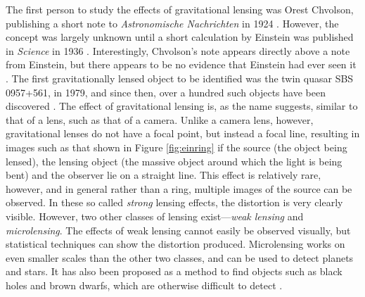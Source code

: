 \documentclass[a4paper,11pt]{article}
\begin{document}
   The first person to study the effects of gravitational lensing was Orest
   Chvolson, publishing a short note to \emph{Astronomische Nachrichten} in 1924
   \cite{chwolsonlensing}. However, the concept was largely unknown until a short
   calculation by Einstein was published in \emph{Science} in 1936
   \cite{einsteinlensing}. Interestingly, Chvolson's note appears directly above a
   note from Einstein\cite{einsteinchwolson}, but there appears to be no evidence that Einstein had ever
   seen it \cite{renn2000eclipses}. The first gravitationally
   lensed object to be identified was the twin quasar SBS 0957+561, in 1979, and
   since then, over a hundred such objects have been discovered
   \cite{firstlens,gravlenscount}. The effect of gravitational lensing is, as the
   name suggests, similar to that of a lens, such as that of a camera. Unlike a
   camera lens, however, gravitational lenses do not have a focal point, but
   instead a focal line, resulting in images such as that shown in Figure
   \ref{fig:einring} if the source (the object being lensed), the lensing object
   (the massive object around which the light is being bent) and the observer lie on a
   straight line. This effect is relatively rare, however, and in general rather
   than a ring, multiple images of the source can be observed. In these so called
   \emph{strong} lensing effects, the distortion is very clearly visible. However,
   two other classes of lensing exist---\emph{weak lensing} and
   \emph{microlensing}.  The effects of weak lensing cannot easily be observed
   visually, but statistical techniques can show the distortion
   produced. Microlensing works on even smaller scales than the other two classes,
   and can be used to detect planets and stars. It has also been proposed as a
   method to find objects such as black holes and brown dwarfs, which are otherwise
   difficult to detect \cite{schneider2006gravitational}.
\end{document}
